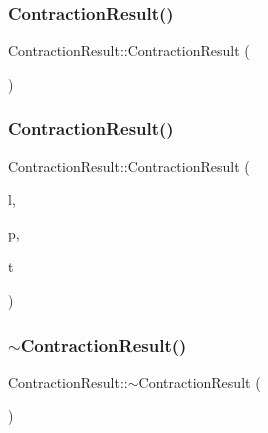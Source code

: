 \subsubsection{\texorpdfstring{Contraction\+Result()}{ContractionResult()}\hspace{0.1cm}{\footnotesize\ttfamily [1/2]}}
{\footnotesize\ttfamily Contraction\+Result\+::\+Contraction\+Result (\begin{DoxyParamCaption}{ }\end{DoxyParamCaption})\hspace{0.3cm}{\ttfamily [inline]}}

\mbox{\label{class_contraction_result_aa63254d104eb42e70978a6a864ce350e}} 
\subsubsection{\texorpdfstring{Contraction\+Result()}{ContractionResult()}\hspace{0.1cm}{\footnotesize\ttfamily [2/2]}}
{\footnotesize\ttfamily Contraction\+Result\+::\+Contraction\+Result (\begin{DoxyParamCaption}\item[{\hyperlink{class_landscape}{Landscape} $\ast$}]{l,  }\item[{\hyperlink{class_restoration_plan}{Restoration\+Plan} $\ast$}]{p,  }\item[{Graph\+\_\+t\+::\+Node}]{t }\end{DoxyParamCaption})\hspace{0.3cm}{\ttfamily [inline]}}

\mbox{\label{class_contraction_result_a2fc9653548df2d9499388f1af8280615}} 
\subsubsection{\texorpdfstring{$\sim$\+Contraction\+Result()}{~ContractionResult()}}
{\footnotesize\ttfamily Contraction\+Result\+::$\sim$\+Contraction\+Result (\begin{DoxyParamCaption}{ }\end{DoxyParamCaption})\hspace{0.3cm}{\ttfamily [inline]}}



